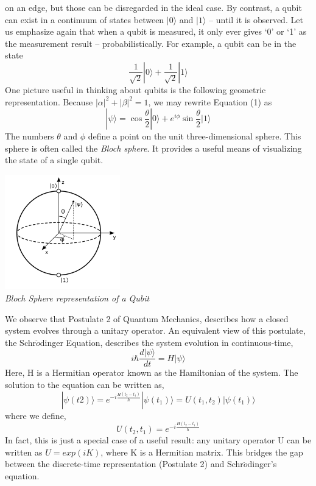 \documentclass[20pt]{report}
\begin{document}
on an edge, but those can be disregarded in the ideal case. By contrast, a qubit can exist
in a continuum of states between $|0\rangle$ and $|1\rangle$ – until it is observed. Let us emphasize
again that when a qubit is measured, it only ever gives ‘0’ or ‘1’ as the measurement
result – probabilistically. For example, a qubit can be in the state
\begin{equation}
\frac{1}{\sqrt{2}}|0\rangle + \frac{1}{\sqrt{2}}|1\rangle
\end{equation}
One picture useful in thinking about qubits is the following geometric representation. Because $|\alpha|^2 + |\beta|^2 = 1$, we may rewrite Equation (1) as
\begin{equation}
|\psi\rangle = \cos{\frac{\theta}{2}}|0\rangle + e^{i\phi} \sin{\frac{\theta}{2}}|1\rangle
\end{equation}
The numbers $\theta$ and $\phi$ define a point on the unit three-dimensional sphere. This sphere is often called the \textit{Bloch sphere}. It provides a useful means of visualizing the state of a single qubit.\\
\begin{center}
\includegraphics[width=5cm]{Sphere} \\
\textit{Bloch Sphere representation of a Qubit} \\
\end{center}
We observe that Postulate 2 of Quantum Mechanics, describes how a closed system evolves through a unitary operator. An equivalent view of this postulate, the Schr$\ddot{o}$dinger Equation, describes the system evolution in
continuous-time,
\begin{equation}
i\hbar \frac{d |\psi\rangle}{dt} = H |\psi\rangle
\end{equation}
Here, H is a Hermitian operator known as the Hamiltonian of the system. The solution to the equation can be written as,
\begin{equation}
|\psi(t2)\rangle = e^{-i \frac{H(t_{2}-t_{1})}{\hbar}}|\psi(t_{1})\rangle = U(t_{1}, t_{2})|\psi(t_{1})\rangle
\end{equation}
where we define,
\begin{equation}
U(t_{2}, t_{1}) = e^{-i \frac{H(t_{2}-t_{1})}{\hbar}}
\end{equation}
In fact, this is just a special case of a useful result: any unitary operator U can be written as $U = exp(iK)$, where K is a Hermitian matrix. This bridges the gap between the discrete-time representation (Postulate 2) and Schr$\ddot{o}$dinger’s equation. \\
\end{document}
